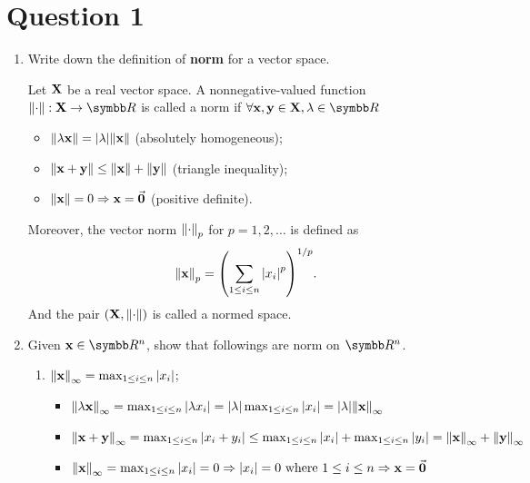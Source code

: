 \section{Question 1}
\begin{enumerate}[label=(\alph*)]
    \item Write down the definition of \textbf{norm} for a vector space.
        \begin{solution}{}{}
            Let $\vb{X}$ be a real vector space. A nonnegative-valued function $\norm{\cdot}: \mX\to\RR$ is called a norm if $\forall\vx,\vy\in\mX, \lambda\in\RR$
            \begin{itemize}
                \item $\norm{\lambda\vb{x}}=\abs{\lambda}\norm{\vb{x}}$ (absolutely homogeneous);
                \item $\norm{\vb{x}+\vb{y}}\leq\norm{\vb{x}}+\norm{\vb{y}}$ (triangle inequality);
                \item $\norm{\vb{x}}=0\Rightarrow\vb{x} =\va{0}$ (positive definite).
            \end{itemize}
            Moreover, the vector norm $\norm{\cdot}_p$ for $p=1,2,\ldots$ is defined as
            \[
                \norm{\vb{x}}_p = \qty(\sum_{1\leq i\leq n}\abs{x_i}^p)^{1/p}.
            \]
            And the pair $(\vb{X}, \norm{\cdot})$ is called a normed space.
        \end{solution}
    \item Given $\vx\in\RR^n$, show that followings are norm on $\RR^n$.
        \begin{enumerate}[label=\roman*.]
            \item $\norm{\vb{x}}_\infty=\max_{1\leq i\leq n}\abs{x_i}$;
                \begin{solution}{}{}
                    \begin{itemize}
                        \item $\norm{\lambda\vb{x}}_\infty=\max_{1\leq i\leq n}\abs{\lambda x_i}=\abs{\lambda}\max_{1\leq i\leq n}\abs{x_i}=\abs{\lambda}\norm{\vb{x}}_\infty$
                        \item $\norm{\vb{x}+\vb{y}}_\infty=\max_{1\leq i\leq n}\abs{x_i+y_i}\leq\max_{1\leq i\leq n}\abs{x_i}+\max_{1\leq i\leq n}\abs{y_i}=\norm{\vb{x}}_\infty+\norm{\vb{y}}_\infty$
                        \item $\norm{\vb{x}}_\infty=\max_{1\leq i\leq n}\abs{x_i}=0\Rightarrow\abs{x_i}=0\text{ where $1\leq i\leq n$}\Rightarrow\vb{x} =\va{0}$
                    \end{itemize}

\end{solution}
\end{enumerate}
\end{enumerate}
